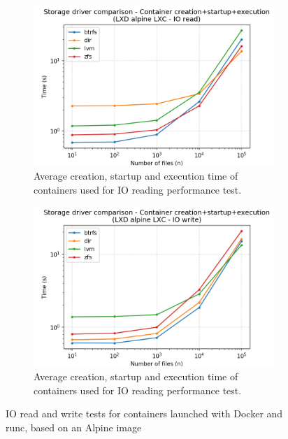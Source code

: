 \begin{figure}[!h]
    \begin{subfigure}{.5\textwidth}
      \centering
      \includegraphics[width=\linewidth]{images/storage-driver/storage-driver-full-LXD-alpine-LXC---IO-read.png}
      \caption{Average creation, startup and execution time of containers used for IO reading performance test.}
      \label{fig:storage-driver:lxc:io-read-full}
    \end{subfigure}
    \begin{subfigure}{.5\textwidth}
      \centering
      \includegraphics[width=\linewidth]{images/storage-driver/storage-driver-full-LXD-alpine-LXC---IO-write.png}
      \caption{Average creation, startup and execution time of containers used for IO reading performance test.}
      \label{fig:storage-driver:lxc:io-write-full}
    \end{subfigure}
    
    \caption{IO read and write tests for containers launched with Docker and runc, based on an Alpine image}
    \label{fig:storage-driver:lxc:io}
\end{figure}

